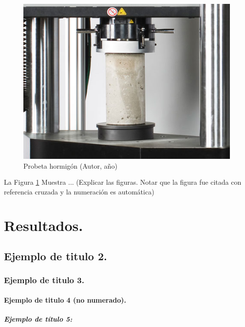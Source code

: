 \documentclass[11pt,letterpaper]{report}
\begin{document}
		\begin{figure}[ht]
			\centering
			\includegraphics[scale=0.5]{imagenes/ASTM_C39_image1.jpg}
			\caption{Probeta hormigón (Autor, año)}
			\label{probetaHormigon} 
		\end{figure}

	La Figura \ref{probetaHormigon} Muestra ... (Explicar las figuras. Notar que la figura fue
	citada con referencia cruzada y la numeración es automática) 
	


\chapter{Resultados.} 

	
	\section{Ejemplo de titulo 2.}
		
		\subsection{Ejemplo de titulo 3.}
			
			\subsubsection{Ejemplo de titulo 4 (no numerado).}

				\paragraph{Ejemplo de título 5:}
\end{document}
